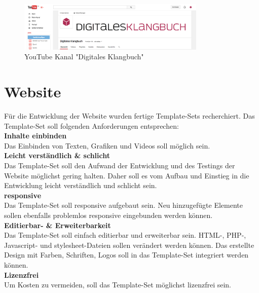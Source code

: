 \begin{figure}[H]
\centering
\includegraphics[width=0.8\textwidth]{grafiken/youtubekanal.png}
\caption{YouTube Kanal "Digitales Klangbuch"}
\end{figure}


\section{Website}

Für die Entwicklung der Website wurden fertige Template-Sets recherchiert. Das Template-Set soll folgenden Anforderungen entsprechen:\\

\textbf{Inhalte einbinden}\\
Das Einbinden von Texten, Grafiken und Videos soll möglich sein.\\

\textbf{Leicht verständlich \& schlicht}\\
Das Template-Set soll den Aufwand der Entwicklung und des Testings der Website möglichst gering halten. Daher soll es vom Aufbau und Einstieg in die Entwicklung leicht verständlich und schlicht sein.\\

\textbf{\gls{responsive}}\\
Das Template-Set soll responsive aufgebaut sein. Neu hinzugefügte Elemente sollen ebenfalls problemlos responsive eingebunden werden können.\\

\textbf{Editierbar- \& Erweiterbarkeit}\\
Das Template-Set soll einfach editierbar und erweiterbar sein. HTML-, PHP-, Javascript- und \Gls{stylesheet}-Dateien sollen verändert werden können. Das erstellte Design mit Farben, Schriften, Logos soll in das Template-Set integriert werden können.\\

\textbf{Lizenzfrei}\\
Um Kosten zu vermeiden, soll das Template-Set möglichst lizenzfrei sein.\\



